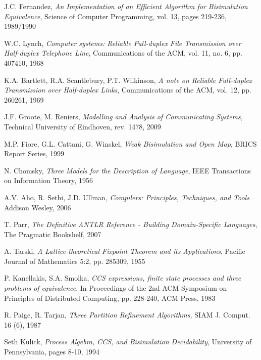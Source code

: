 \begin{thebibliography}{[1]}
J.C. Fernandez, 
\emph{An Implementation of an Efficient Algorithm for Bisimulation
Equivalence}, Science of Computer Programming, vol. 13, pages 219-236, 1989/1990

W.C. Lynch, 
\emph{Computer systems: Reliable Full-duplex File Transmission over Half-duplex Telephone Line},
Communications of the ACM, vol. 11, no. 6, pp. 407410, 1968

K.A. Bartlett, R.A. Scantlebury, P.T. Wilkinson, 
\emph{A note on Reliable Full-duplex Transmission over Half-duplex Links},
Communications of the ACM, vol. 12, pp. 260261, 1969


J.F. Groote, M. Reniers, 
\emph{Modelling and Analysis of Communicating Systems}\emph, 
Technical University of Eindhoven, rev. 1478, 2009

M.P. Fiore, G.L. Cattani, G. Winskel,
\emph{Weak Bisimulation and Open Map},
BRICS Report Series, 1999

N. Chomsky,
\emph{Three Models for the Description of Language},
IEEE Transactions on Information Theory, 1956

A.V. Aho, R. Sethi, J.D. Ullman,
\emph{Compilers: Principles, Techniques, and Tools}
Addison Wesley, 2006

T. Parr, 
\emph{The Definitive ANTLR Reference - Building Domain-Specific Languages}, 
The Pragmatic Bookshelf, 2007

A. Tarski,
\emph{A Lattice-theoretical Fixpoint Theorem and its Applications},
Pacific Journal of Mathematics 5:2, pp. 285309, 1955

P. Kanellakis, S.A. Smolka,
\emph{CCS expressions, finite state processes and three problems of equivalence},
In Proceedings of the 2nd ACM Symposium on Principles of Distributed Computing, pp. 228-240, ACM Press, 1983

R. Paige, R. Tarjan, 
\emph{Three Partition Refinement Algorithms}\emph, 
SIAM J. Comput. 16 (6), 1987

Seth Kulick,
\emph{Process Algebra, CCS, and Bisimulation Decidability},
University of Pennsylvania, pages 8-10, 1994

%
%

\end{thebibliography}